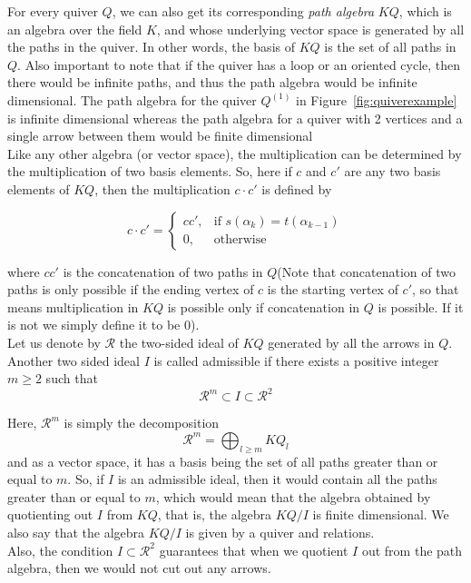 \documentclass{report}
\theoremstyle{definition}
\numberwithin{figure}{section}
\begin{document}
 For every quiver $Q$, we can also get its corresponding \textit{path algebra} $KQ$, which is an algebra over the field $K$, and whose underlying vector space is generated by all the paths in the quiver. In other words, the basis of $KQ$ is the set of all paths in $Q$. Also important to note that if the quiver has a loop or an oriented cycle, then there would be infinite paths, and thus the path algebra would be infinite dimensional. The path algebra for the quiver $Q^{(1)}$ in Figure~\ref{fig:quiverexample} is infinite dimensional whereas the path algebra for a quiver with 2 vertices and a single arrow between them would be finite dimensional\\
 
 Like any other algebra (or vector space), the multiplication can be determined by the multiplication of two basis elements. So, here if $c$ and $c'$ are any two basis elements of $KQ$, then the multiplication $c \cdot c'$ is defined by 

 \[
c \cdot c' = 
\begin{cases}c  c' , & \text{if } s(\alpha_k)=t(\alpha_{k-1}) \\
0, & \text{otherwise }
\end{cases}
\]

where $c c'$ is the concatenation of two paths in $Q$(Note that concatenation of two paths is only possible if the ending vertex of $c$ is the starting vertex of $c'$, so that means multiplication in $KQ$ is possible only if concatenation in $Q$ is possible. If it is not we simply define it to be 0). \\


Let us denote by $\mathcal{R}$ the two-sided ideal of $KQ$ generated by all the arrows in $Q$. Another two sided ideal $I$ is called admissible if there exists a positive integer $m\geq 2$ such that 
\[
\mathcal{R}^m \subset I \subset \mathcal{R}^2
\]

Here, $\mathcal{R}^m$ is simply the decomposition $$\mathcal{R}^m=\bigoplus_{l \geq m}KQ_l$$ and as a vector space, it has a basis being the set of all paths greater than or equal to $m$. So, if $I$ is an admissible ideal, then it would contain all the paths greater than or equal to $m$, which would mean that the algebra obtained by quotienting out $I$ from $KQ$, that is, the algebra $KQ/I$ is finite dimensional. We also say that the algebra $KQ/I$ is given by a quiver and relations. \\
Also, the condition $I \subset\mathcal{R}^2$ guarantees that when we quotient $I$ out from the path algebra, then we would not cut out any arrows.\\
\end{document}
